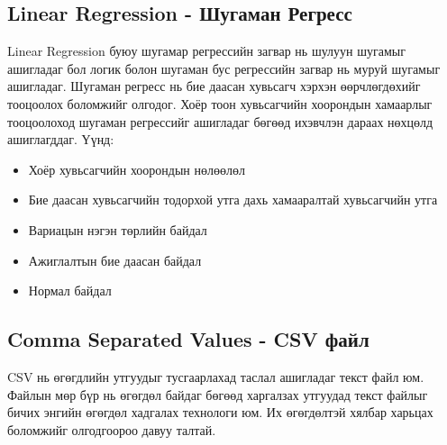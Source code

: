 \subsection{Linear Regression - Шугаман Регресс}
Linear Regression буюу шугамар регрессийн загвар нь шулуун шугамыг ашигладаг бол логик болон шугаман бус регрессийн загвар нь муруй шугамыг ашигладаг. Шугаман регресс нь бие даасан хувьсагч хэрхэн өөрчлөгдөхийг тооцоолох боломжийг олгодог. Хоёр тоон хувьсагчийн хоорондын хамаарлыг тооцоолоход шугаман регрессийг ашигладаг бөгөөд ихэвчлэн дараах нөхцөлд ашиглагддаг. Үүнд:
\begin{itemize}
  \item Хоёр хувьсагчийн хоорондын нөлөөлөл
  \item Бие даасан хувьсагчийн тодорхой утга дахь хамааралтай хувьсагчийн утга
  \item Вариацын нэгэн төрлийн байдал
  \item Ажиглалтын бие даасан байдал
  \item Нормал байдал
\end{itemize}
\subsection{Comma Separated Values - CSV файл}
CSV нь өгөгдлийн утгуудыг тусгаарлахад таслал ашигладаг текст файл юм. Файлын мөр бүр нь өгөгдөл байдаг бөгөөд харгалзах утгуудад текст файлыг бичих энгийн өгөгдөл хадгалах технологи юм. Их өгөгдөлтэй хялбар харьцах боломжийг олгодгоороо давуу талтай.
